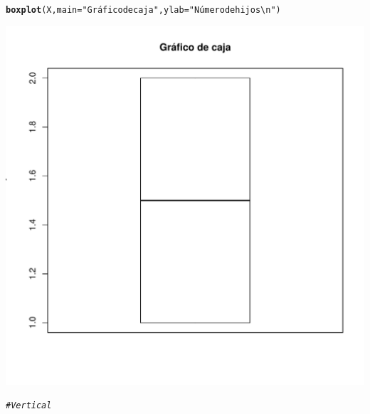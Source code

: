 \documentclass[12pt,letterpaper]{article}\usepackage[]{graphicx}\usepackage[]{color}
\makeatletter
\def\maxwidth{ %
  \ifdim\Gin@nat@width>\linewidth
    \linewidth
  \else
    \Gin@nat@width
  \fi
}
\newcommand{\hlstr}[1]{\textcolor[rgb]{0.192,0.494,0.8}{#1}}%
\newcommand{\hlcom}[1]{\textcolor[rgb]{0.678,0.584,0.686}{\textit{#1}}}%
\newcommand{\hlstd}[1]{\textcolor[rgb]{0.345,0.345,0.345}{#1}}%
\newcommand{\hlkwc}[1]{\textcolor[rgb]{0.333,0.667,0.333}{#1}}%
\newcommand{\hlkwd}[1]{\textcolor[rgb]{0.737,0.353,0.396}{\textbf{#1}}}%
\newenvironment{kframe}{%
 \def\at@end@of@kframe{}%
 \ifinner\ifhmode%
  \def\at@end@of@kframe{\end{minipage}}%
  \begin{minipage}{\columnwidth}%
 \fi\fi%
 \def\FrameCommand##1{\hskip\@totalleftmargin \hskip-\fboxsep
 \colorbox{shadecolor}{##1}\hskip-\fboxsep
     \hskip-\linewidth \hskip-\@totalleftmargin \hskip\columnwidth}%
 \MakeFramed {\advance\hsize-\width
   \@totalleftmargin\z@ \linewidth\hsize
   \@setminipage}}%
 {\par\unskip\endMakeFramed%
 \at@end@of@kframe}
\newenvironment{knitrout}{}{} %
\makeatother
\begin{document}
\begin{enumerate}
\begin{knitrout}
\begin{kframe}
\begin{alltt}
\hlkwd{boxplot}\hlstd{(X,} \hlkwc{main}\hlstd{=}\hlstr{"Gráfico de caja"}\hlstd{,} \hlkwc{ylab}\hlstd{=}\hlstr{"Número de hijos\textbackslash{}n"}\hlstd{)}
\end{alltt}
\end{kframe}
\includegraphics[width=\maxwidth]{figure/unnamed-chunk-27-1} 

\end{knitrout}

\begin{knitrout}
\color{fgcolor}\begin{kframe}
\begin{alltt}
\hlcom{# Vertical }


\end{alltt}
\end{kframe}
\end{knitrout}
\end{enumerate}
\end{document}
